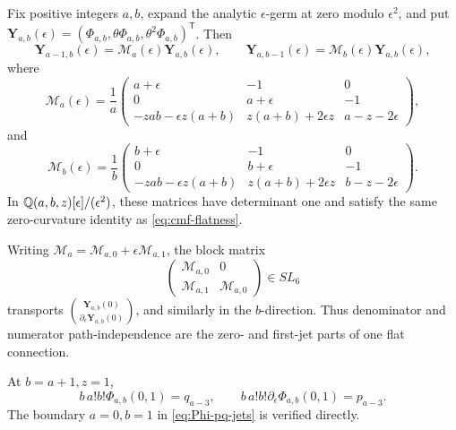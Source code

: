 \begin{theorem}
\label{thm:ram-sl6}
Fix positive integers \(a,b\), expand the analytic \(\epsilon\)-germ at
zero modulo \(\epsilon^2\), and put
\(\mathbf Y_{a,b}(\epsilon)
=(\Phi_{a,b},\theta\Phi_{a,b},\theta^2\Phi_{a,b})^{\mathsf T}\).
Then
\begin{equation}\label{eq:epsilon-contiguous}
 \mathbf Y_{a-1,b}(\epsilon)=\mathscr M_a(\epsilon)\mathbf Y_{a,b}(\epsilon),
 \qquad
 \mathbf Y_{a,b-1}(\epsilon)=\mathscr M_b(\epsilon)\mathbf Y_{a,b}(\epsilon),
\end{equation}
where
\begin{equation}\label{eq:epsilon-Ma}
 \mathscr M_a(\epsilon)=\frac1a
 \begin{pmatrix}
 a+\epsilon&-1&0\\
 0&a+\epsilon&-1\\
 -zab-\epsilon z(a+b)&z(a+b)+2\epsilon z&a-z-2\epsilon
 \end{pmatrix},
\end{equation}
and
\begin{equation}\label{eq:epsilon-Mb}
 \mathscr M_b(\epsilon)=\frac1b
 \begin{pmatrix}
 b+\epsilon&-1&0\\
 0&b+\epsilon&-1\\
 -zab-\epsilon z(a+b)&z(a+b)+2\epsilon z&b-z-2\epsilon
 \end{pmatrix}.
\end{equation}
In
\(\mathbb Q(a,b,z)[\epsilon]/(\epsilon^2)\), these matrices have determinant one
and satisfy the same zero-curvature identity as
\eqref{eq:cmf-flatness}.

Writing
\(\mathscr M_a=\mathscr M_{a,0}+\epsilon\mathscr M_{a,1}\), the block matrix
\begin{equation}\label{eq:SL6-block}
 \begin{pmatrix}
 \mathscr M_{a,0}&0\\
 \mathscr M_{a,1}&\mathscr M_{a,0}
 \end{pmatrix}\in SL_6
\end{equation}
transports
\(\binom{\mathbf Y_{a,b}(0)}
{\partial_\epsilon\mathbf Y_{a,b}(0)}\), and similarly in the
\(b\)-direction.  Thus denominator and numerator path-independence are the
zero- and first-jet parts of one flat connection.

At \(b=a+1,z=1\),
\begin{equation}\label{eq:Phi-pq-jets}
 b\,a!b!\Phi_{a,b}(0,1)=q_{a-3},\qquad
 b\,a!b!\partial_\epsilon\Phi_{a,b}(0,1)=p_{a-3}.
\end{equation}
The boundary \(a=0,b=1\) in \eqref{eq:Phi-pq-jets} is verified directly.
\end{theorem}

